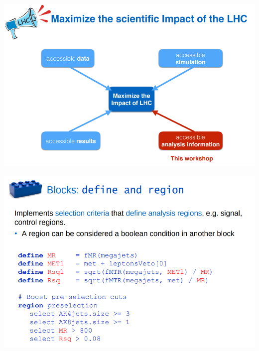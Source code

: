 \documentclass[aspectratio=169]{beamer}
\begin{document}
\begin{frame}{}
\vspace{-0.5 cm}
\begin{center}
\includegraphics[height=9.05 cm]{slides-01.png}
\end{center}
\end{frame}

\begin{frame}{}
\vspace{-0.35 cm}
\begin{center}
\includegraphics[height=9.3 cm]{slides-02.png}
\end{center}
\end{frame}
\end{document}
